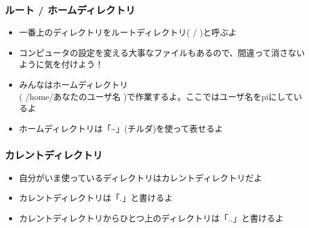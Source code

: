 \begin{frame}
    \frametitle{ルート / ホームディレクトリ}
    \begin{minipage}{0.45\hsize}
        \footnotesize
        \centering
        
        \begin{itemize}
            \item 一番上のディレクトリをルートディレクトリ( / )と呼ぶよ
            \item コンピュータの設定を変える大事なファイルもあるので、間違って消さないように気を付けよう！
        \end{itemize}
    \end{minipage}
    \begin{minipage}{0.45\hsize}
        \footnotesize
        \centering
        
        \begin{itemize}
            \item みんなはホームディレクトリ\\( /home/あなたのユーザ名 )で作業するよ。ここではユーザ名をpiにしているよ
            \item ホームディレクトリは「\textasciitilde」(チルダ)を使って表せるよ
        \end{itemize}
    \end{minipage}
\end{frame}

\begin{frame}
    \frametitle{カレントディレクトリ}
    \begin{itemize}
        \item 自分がいま使っているディレクトリはカレントディレクトリだよ
        \item カレントディレクトリは「.」と書けるよ
        \item カレントディレクトリからひとつ上のディレクトリは「..」と書けるよ
    \end{itemize}
\end{frame}

